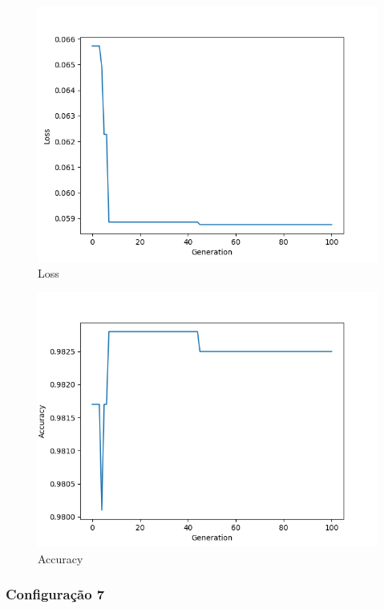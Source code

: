 \documentclass[twoside,conference,a4paper]{IEEEtran}
\begin{document}
\begin{figure}[htbp]
        \centering \includegraphics[width=1\columnwidth]{./ia_proj_images/mnist/6/loss.png}
        \caption{
                \label{fig:loss_mnist_06}
                Loss
        }
\end{figure}
\begin{figure}[htbp]
        \centering \includegraphics[width=1\columnwidth]{./ia_proj_images/mnist/6/acc.png}
        \caption{
                \label{fig:acc_mnist_06}
                Accuracy
        }
\end{figure}

\subsubsection{Configuração 7}
\end{document}
